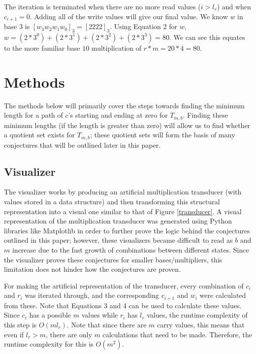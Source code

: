 \documentclass{article}
\begin{document}
The iteration is terminated when there are no more read values ($i > l_r$) and when $c_{i+1} = 0$. Adding all of the write values will give our final value. We know $w$ in base 3 is $[w_3w_2w_1w_0]_3 = [2222]_3$. Using Equation 2 for $w$, $w = (2 * 3^0) + (2*3^1) + (2*3^2) + (2*3^3) = 80$. We can see this equates to the more familiar base $10$ multiplication of $r * m = 20 * 4 = 80$. \vspace{\baselineskip}

\section{Methods}

The methods below will primarily cover the steps towards finding the minimum length for a path of $c$'s starting and ending at zero for $T_{m,b}$. Finding these minimum lengths (if the length is greater than zero) will allow us to find whether a quotient set exists for $T_{m,b}$; these quotient sets will form the basis of many conjectures that will be outlined later in this paper. 

\subsection{Visualizer}


\hspace*{5mm} The visualizer works by producing an artificial multiplication transducer (with values stored in a data structure) and then transforming this structural representation into a visual one similar to that of Figure \ref{transducer}. A visual representation of the multiplication transducer was generated using Python libraries like Matplotlib in order to further prove the logic behind the conjectures outlined in this paper; however, these visualizers became difficult to read as $b$ and $m$ increase due to the fast growth of combinations between different states. Since the visualizer proves these conjectures for smaller bases/multipliers, this limitation does not hinder how the conjectures are proven. \vspace{\baselineskip}

For making the artificial representation of the transducer, every combination of $c_i$ and $r_i$ was iterated through, and the corresponding $c_{i+1}$ and $w_i$ were calculated from these. Note that Equations 3 and 4 can be used to calculate these values. Since $c_i$ has a possible $m$ values while $r_i$ has $l_r$ values, the runtime complexity of this step is $O(ml_r)$. Note that since there are $m$ carry values, this means that even if $l_r > m$, there are only $m$ calculations that need to be made. Therefore, the runtime complexity for this is $O(m^2)$. \vspace{\baselineskip}
\end{document}
